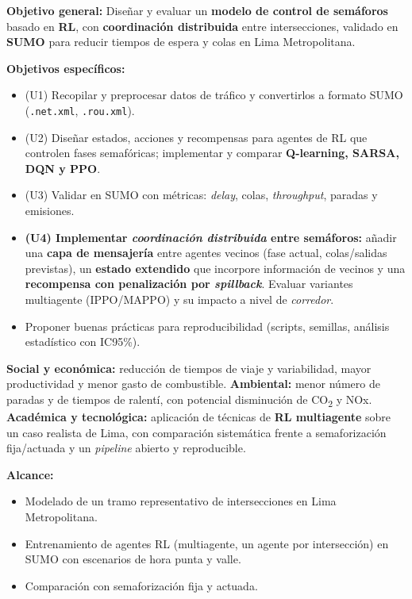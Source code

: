 \textbf{Objetivo general:} Diseñar y evaluar un \textbf{modelo de control de semáforos} basado en \textbf{RL}, con \textbf{coordinación distribuida} entre intersecciones, validado en \textbf{SUMO} para reducir tiempos de espera y colas en Lima Metropolitana.

\textbf{Objetivos específicos:}
\begin{itemize}
    \item (U1) Recopilar y preprocesar datos de tráfico y convertirlos a formato SUMO (\texttt{.net.xml}, \texttt{.rou.xml}).
    \item (U2) Diseñar estados, acciones y recompensas para agentes de RL que controlen fases semafóricas; implementar y comparar \textbf{Q-learning, SARSA, DQN y PPO}.
    \item (U3) Validar en SUMO con métricas: \textit{delay}, colas, \textit{throughput}, paradas y emisiones.
    \item \textbf{(U4) Implementar \textit{coordinación distribuida} entre semáforos:} añadir una \textbf{capa de mensajería} entre agentes vecinos (fase actual, colas/salidas previstas), un \textbf{estado extendido} que incorpore información de vecinos y una \textbf{recompensa con penalización por \textit{spillback}}. Evaluar variantes multiagente (IPPO/MAPPO) y su impacto a nivel de \textit{corredor}.
    \item Proponer buenas prácticas para reproducibilidad (scripts, semillas, análisis estadístico con IC95\%).
\end{itemize}



\textbf{Social y económica:} reducción de tiempos de viaje y variabilidad, mayor productividad y menor gasto de combustible. \textbf{Ambiental:} menor número de paradas y de tiempos de ralentí, con potencial disminución de CO\textsubscript{2} y NOx. \textbf{Académica y tecnológica:} aplicación de técnicas de \textbf{RL multiagente} sobre un caso realista de Lima, con comparación sistemática frente a semaforización fija/actuada y un \textit{pipeline} abierto y reproducible.


\textbf{Alcance:}
\begin{itemize}
    \item Modelado de un tramo representativo de intersecciones en Lima Metropolitana.
    \item Entrenamiento de agentes RL (multiagente, un agente por intersección) en SUMO con escenarios de hora punta y valle.
    \item Comparación con semaforización fija y actuada.
\end{itemize}


